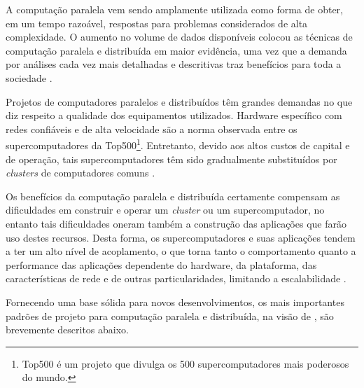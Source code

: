 \documentclass[english,brazilian]{UNISINOSmonografia} %
\begin{document}
A computação paralela vem sendo amplamente utilizada como forma de obter, em um tempo razoável, respostas para problemas considerados de alta complexidade.
O aumento no volume de dados disponíveis colocou as técnicas de computação paralela e distribuída em maior evidência, uma vez que a demanda por análises cada vez mais detalhadas e descritivas traz benefícios para toda a sociedade \cite{wilkinson1999parallel}.


Projetos de computadores paralelos e distribuídos têm grandes demandas no que diz respeito a qualidade dos equipamentos utilizados. 
Hardware específico com redes confiáveis e de alta velocidade são a norma observada entre os supercomputadores da Top500\footnote{
	Top500 é um projeto que divulga os 500 supercomputadores mais poderosos do mundo.
}.
Entretanto, devido aos altos custos de capital e de operação, tais supercomputadores têm sido gradualmente substituídos por \textit{clusters} de computadores comuns \cite{Baker1999}.


Os benefícios da computação paralela e distribuída certamente compensam as dificuldades em construir e operar um \textit{cluster} ou um supercomputador, no entanto tais dificuldades oneram também a construção das aplicações que farão uso destes recursos. 
Desta forma, os supercomputadores e suas aplicações tendem a ter um alto nível de acoplamento, o que torna tanto o comportamento quanto a performance das aplicações dependente do hardware, da plataforma, das características de rede e de outras particularidades, limitando a escalabilidade \cite{Rajan2011}.

Fornecendo uma base sólida para novos desenvolvimentos, os mais importantes padrões de projeto para computação paralela e distribuída, na visão de , são brevemente descritos abaixo.
\end{document}
